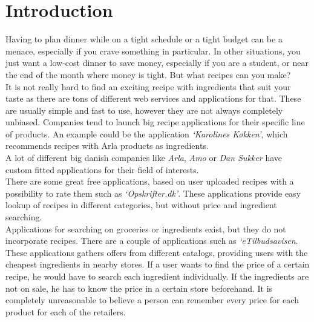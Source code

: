 \chapter{Introduction}
\label{chap:intro}

Having to plan dinner while on a tight schedule or a tight budget can be a menace, especially if you crave something in particular. In other situations, you just want a low-cost dinner to save money, especially if you are a student, or near the end of the month where money is tight. But what recipes can you make?\\
It is not really hard to find an exciting recipe with ingredients that suit your taste as there are tons of different web services and applications for that. These are usually simple and fast to use, however they are not always completely unbiased. Companies tend to launch big recipe applications for their specific line of products. An example could be the application \emph{`Karolines Køkken'}\cite{arla}, which recommends recipes with Arla products as ingredients.\\ A lot of different big danish companies like \textit{Arla}, \textit{Amo} or \textit{Dan Sukker} have custom fitted applications for their field of interests. \\
There are some great free applications, based on user uploaded recipes with a possibility to rate them such as \emph{`Opskrifter.dk'}\cite{opskrifterdk}. These applications provide easy lookup of recipes in different categories, but without price and ingredient searching. \\
Applications for searching on groceries or ingredients exist, but they do not incorporate recipes. There are a couple of applications such as \emph{`eTilbudsavisen}\cite{etilbudsavis}. These applications gathers offers from different catalogs, providing users with the cheapest ingredients in nearby stores. If a user wants to find the price of a certain recipe, he would have to search each ingredient individually. If the ingredients are not on sale, he has to know the price in a certain store beforehand. It is completely unreasonable to believe a person can remember every price for each product for each of the retailers.






